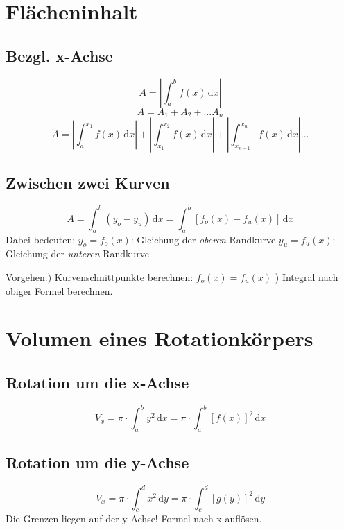 \documentclass[a4paper,DIV10,12pt,headsepline,smallheadings,halfparskip-]{scrreprt}
\begin{document}
	\section{Flächeninhalt} %
	\label{sec:flächeninhalt}
	\subsection{Bezgl. x-Achse} %
	\label{sub:bezgl_x_achse}
	\[ A = \left| \int_a^b f(x)\,\mathrm{d}x \right|\]
	\[ A = A_1 + A_2 + ... A_n\]
	\[ A = \left| \int_a^{x_1} f(x)\,\mathrm{d}x \right| + \left| \int_{x_1}^{x_2} f(x)\,\mathrm{d}x \right| + \left| \int_{x_{n-1}}^{x_n} f(x)\,\mathrm{d}x \right| ... \]
	\subsection{Zwischen zwei Kurven} %
	\label{sub:zwischen_zwei_kurven}
	\[ A = \int_a^b (y_o - y_u)\,\mathrm{d}x = \int_a^b [f_o(x) - f_u(x)]\,\mathrm{d}x\]
	Dabei bedeuten:\newline
	\( y_o = f_o(x)\): Gleichung der \emph{oberen} Randkurve\newline
	\( y_u = f_u(x)\): Gleichung der \emph{unteren} Randkurve
	
	Vorgehen:) Kurvenschnittpunkte berechnen:\newline
	\(f_o(x) = f_u(x)\) ) Integral nach obiger Formel berechnen.
	
	
	\section{Volumen eines Rotationkörpers} %
	\label{sec:volumen_eines_rotationkörpers}
	\subsection{Rotation um die x-Achse} %
	\label{sub:rotation_um_die_x_achse}
	\[ V_x = \pi \cdot \int_a^b y^2\,\mathrm{d}x = \pi \cdot \int_a^b [f(x)]^2\,\mathrm{d}x \]
	\subsection{Rotation um die y-Achse} %
	\label{sub:rotation_um_die_y_achse}
	\[ V_x = \pi \cdot \int_c^d x^2\,\mathrm{d}y = \pi \cdot \int_c^d [g(y)]^2\,\mathrm{d}y \]
	Die Grenzen liegen auf der y-Achse! Formel nach x auflösen.
\end{document}
